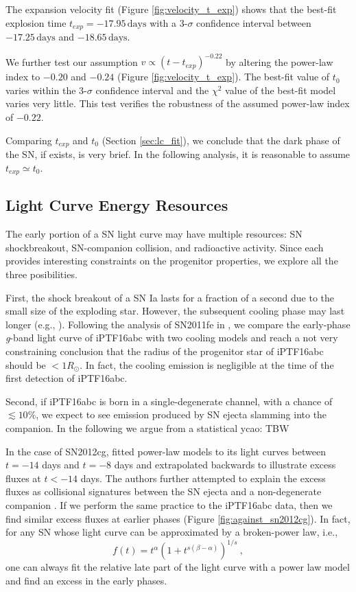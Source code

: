 \documentclass[twocolumn]{aastex61}
\newcommand{\sr}{R_\odot}
\newcommand{\ycao}[1]{{\color{red} ycao: {#1}}}
\begin{document}
The expansion velocity fit (Figure \ref{fig:velocity_t_exp}) shows
that the best-fit explosion time $t_{exp}=-17.95\,\textrm{days}$ with
a 3-$\sigma$ confidence interval between $-17.25\,\textrm{days}$ and
$-18.65\,\textrm{days}$.

We further test our assumption $v\propto (t-t_{exp})^{-0.22}$ by
altering the power-law index to $-0.20$ and $-0.24$ (Figure
\ref{fig:velocity_t_exp}).  The best-fit value of $t_0$ varies within
the 3-$\sigma$ confidence interval and the $\chi^2$ value of the
best-fit model varies very little. This test verifies the robustness
of the assumed power-law index of $-0.22$.

Comparing $t_{exp}$ and $t_0$ (Section \ref{sec:lc_fit}), we conclude
that the dark phase of the SN, if exists, is very brief. In the
following analysis, it is reasonable to assume $t_{exp}\simeq t_0$.

\subsection{Light Curve Energy Resources}
\label{sec:lc_energy}

The early portion of a SN light curve may have multiple resources: SN
shockbreakout, SN-companion collision, and radioactive activity. Since
each provides interesting constraints on the progenitor properties, we
explore all the three posibilities.

First, the shock breakout of a SN Ia lasts for a fraction of a second
due to the small size of the exploding star. However, the subsequent
cooling phase may last longer (e.g., \citealt{2010ApJ...708..598P}).
Following the analysis of SN2011fe in \citet{2012ApJ...744L..17B}, we
compare the early-phase \textit{g}-band light curve of iPTF16abc with
two cooling models \citep{2011ApJ...728...63R, 2010ApJ...708..598P}
and reach a not very constraining conclusion that the radius of the
progenitor star of iPTF16abc should be $<1\sr$. In fact, the cooling
emission is negligible at the time of the first detection of iPTF16abc.

Second, if iPTF16abc is born in a single-degenerate channel, with a
chance of $\lesssim10\%$, we expect to see emission produced by SN
ejecta slamming into the companion. In the following we argue from a
statistical \ycao{TBW}

In the case of SN2012cg, \citet{2016ApJ...820...92M} fitted power-law
models to its light curves between $t=-14$ days and $t=-8$ days and
extrapolated backwards to illustrate excess fluxes at $t<-14$
days. The authors further attempted to explain the excess fluxes as
collisional signatures between the SN ejecta and a non-degenerate
companion \citep{2010ApJ...708.1025K}. If we perform the same practice
to the iPTF16abc data, then we find similar excess fluxes at earlier
phases (Figure \ref{fig:against_sn2012cg}). In fact, for any SN whose
light curve can be approximated by a broken-power law, i.e.,
\begin{equation}
  \label{eq:broken-pow}
  f(t) = t^{\alpha}(1 + t^{s(\beta - \alpha)})^{1/s}\ ,
\end{equation}
one can always fit the relative late part of the light curve with a
power law model and find an excess in the early phases.
\end{document}
